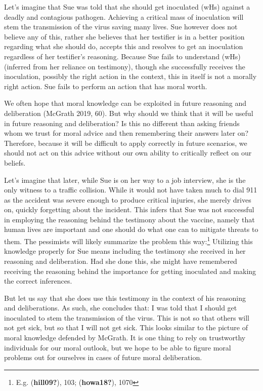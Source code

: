 \documentclass[12pt]{book}
\theoremstyle{definition}
\theoremstyle{remark}
\begin{document}
Let's imagine that Sue was told that she should get inoculated (wHs) against a deadly and contagious pathogen. Achieving a critical mass of inoculation will stem the transmission of the virus saving many lives. Sue however does not believe any of this, rather she believes that her testifier is in a better position regarding what she should do, accepts this and resolves to get an inoculation regardless of her testifier's reasoning. Because Sue fails to understand (wHs) (inferred from her reliance on testimony), though she successfully receives the inoculation, possibly the right action in the context, this in itself is not a morally right action. Sue fails to perform an action that has moral worth.

We often hope that moral knowledge can be exploited in future reasoning and deliberation (McGrath 2019, 60). But why should we think that it will be useful in future reasoning and deliberation? Is this no different than asking friends whom we trust for moral advice and then remembering their answers later on? Therefore, because it will be difficult to apply correctly in future scenarios, we should not act on this advice without our own ability to critically reflect on our beliefs.

Let's imagine that later, while Sue is on her way to a job interview, she is the only witness to a traffic collision. While it would not have taken much to dial 911 as the accident was severe enough to produce critical injuries, she merely drives on, quickly forgetting about the incident. This infers that Sue was not successful in employing the reasoning behind the testimony about the vaccine, namely that human lives are important and one should do what one can to mitigate threats to them. The pessimists will likely summarize the problem this way:\footnote{E.g. (\textbf{hill09?}), 103; (\textbf{howa18?}), 1070} Utilizing this knowledge properly for Sue means including the testimony she received in her reasoning and deliberation. Had she done this, she might have remembered receiving the reasoning behind the importance for getting inoculated and making the correct inferences.

But let us say that she does use this testimony in the context of his reasoning and deliberations. As such, she concludes that: I was told that I should get inoculated to stem the transmission of the virus. This is not so that others will not get sick, but so that I will not get sick. This looks similar to the picture of moral knowledge defended by McGrath. It is one thing to rely on trustworthy individuals for our moral outlook, but we hope to be able to figure moral problems out for ourselves in cases of future moral deliberation.
\end{document}
